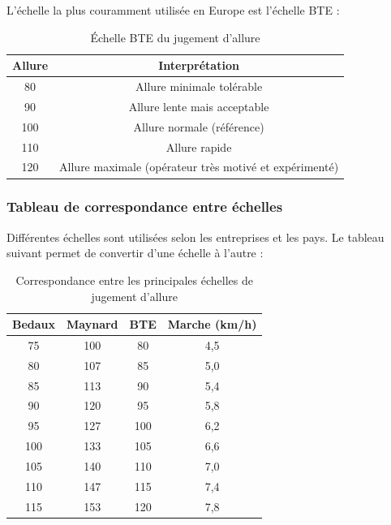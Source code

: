 \documentclass[a4paper,12pt]{article}
\begin{document}
L'échelle la plus couramment utilisée en Europe est l'échelle BTE :

\begin{table}[ht]
\centering
\begin{tabular}{|c|c|}
\hline
\textbf{Allure} & \textbf{Interprétation} \\
\hline
80 & Allure minimale tolérable \\
90 & Allure lente mais acceptable \\
100 & Allure normale (référence) \\
110 & Allure rapide \\
120 & Allure maximale (opérateur très motivé et expérimenté) \\
\hline
\end{tabular}
\caption{Échelle BTE du jugement d'allure}
\end{table}

\begin{center}
\end{center}

\subsubsection{Tableau de correspondance entre échelles}

Différentes échelles sont utilisées selon les entreprises et les pays. Le tableau suivant permet de convertir d'une échelle à l'autre :

\begin{table}[ht]
\centering
\begin{tabular}{|c|c|c|c|}
\hline
\textbf{Bedaux} & \textbf{Maynard} & \textbf{BTE} & \textbf{Marche (km/h)} \\
\hline
75 & 100 & 80 & 4,5 \\
80 & 107 & 85 & 5,0 \\
85 & 113 & 90 & 5,4 \\
90 & 120 & 95 & 5,8 \\
95 & 127 & 100 & 6,2 \\
100 & 133 & 105 & 6,6 \\
105 & 140 & 110 & 7,0 \\
110 & 147 & 115 & 7,4 \\
115 & 153 & 120 & 7,8 \\
\hline
\end{tabular}
\caption{Correspondance entre les principales échelles de jugement d'allure}
\end{table}
\end{document}
